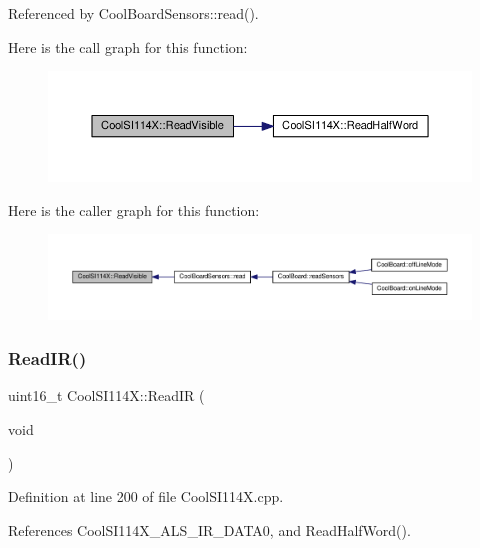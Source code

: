 Referenced by Cool\+Board\+Sensors\+::read().

Here is the call graph for this function\+:
\nopagebreak
\begin{figure}[H]
\begin{center}
\leavevmode
\includegraphics[width=350pt]{dd/d67/class_cool_s_i114_x_a42e0e574256341443c647a4c0eda87d5_cgraph}
\end{center}
\end{figure}
Here is the caller graph for this function\+:
\nopagebreak
\begin{figure}[H]
\begin{center}
\leavevmode
\includegraphics[width=350pt]{dd/d67/class_cool_s_i114_x_a42e0e574256341443c647a4c0eda87d5_icgraph}
\end{center}
\end{figure}
\mbox{\label{class_cool_s_i114_x_abc536ee7ae8e3ba9d1069acc3889a2cf}} 
\subsubsection{\texorpdfstring{Read\+I\+R()}{ReadIR()}}
{\footnotesize\ttfamily uint16\+\_\+t Cool\+S\+I114\+X\+::\+Read\+IR (\begin{DoxyParamCaption}\item[{void}]{ }\end{DoxyParamCaption})}



Definition at line 200 of file Cool\+S\+I114\+X.\+cpp.



References Cool\+S\+I114\+X\+\_\+\+A\+L\+S\+\_\+\+I\+R\+\_\+\+D\+A\+T\+A0, and Read\+Half\+Word().




